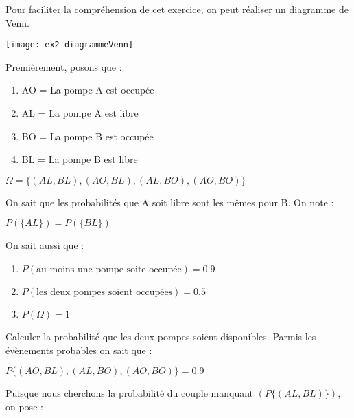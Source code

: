 \begin{exo}

  Pour faciliter la compréhension de cet exercice, on peut réaliser un diagramme de Venn.
  \begin{center}\texttt{[image: ex2-diagrammeVenn]}\end{center}
  Premièrement, posons que :
  \begin{multicols}{4}
    \begin{enumerate}[label=\alph*), parsep=0cm, itemsep=3mm, topsep=3mm]
      \item[ ] AO = La pompe A est occupée
      \item[ ] AL = La pompe A est libre
      \item[ ] BO = La pompe B est occupée
      \item[ ] BL = La pompe B est libre
    \end{enumerate}
  \end{multicols}
  \begin{center}$\Omega = \{(AL,BL),(AO,BL),(AL,BO),(AO,BO)\}$ \end{center}
  On sait que les probabilités que A soit libre sont les mêmes pour B. On note :
  \begin{center}$P(\{AL\}) = P(\{BL\})$\end{center}
  On sait aussi que :
  \begin{enumerate}
    \item[ ] $P(\text{au moins une pompe soite occupée}) = 0.9$
    \item[ ] $P(\text{les deux pompes soient occupées}) = 0.5$
    \item[ ] $P(\Omega) = 1$
  \end{enumerate}
  \begin{subexo}{Calculer la probabilité que les deux pompes soient disponibles.}
    Parmis les évènements probables on sait que :
    \begin{center}$P\{(AO,BL),(AL,BO),(AO,BO)\} = 0.9$\end{center}
    Puisque nous cherchons la probabilité du couple manquant $(P\{(AL,BL)\})$, on pose :

\end{subexo}
\end{exo}
